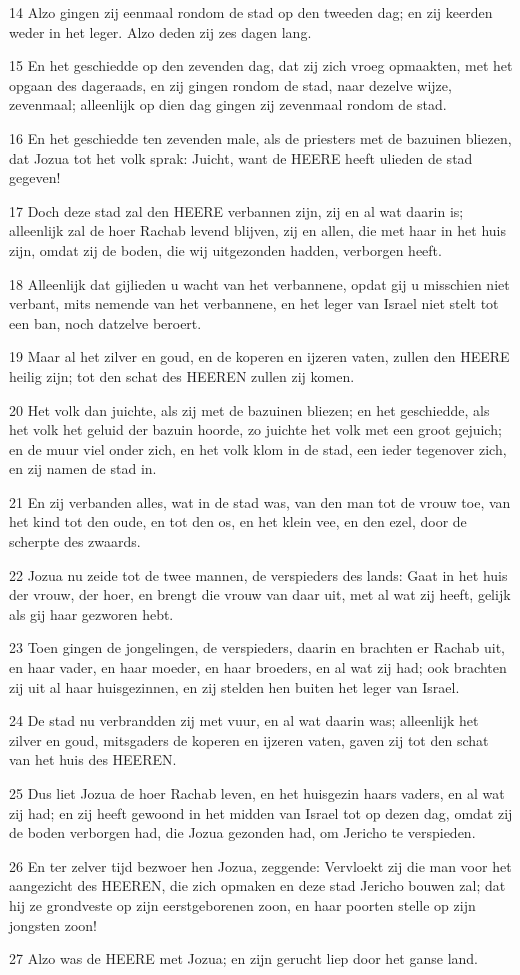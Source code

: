 \par 14 Alzo gingen zij eenmaal rondom de stad op den tweeden dag; en zij keerden weder in het leger. Alzo deden zij zes dagen lang.
\par 15 En het geschiedde op den zevenden dag, dat zij zich vroeg opmaakten, met het opgaan des dageraads, en zij gingen rondom de stad, naar dezelve wijze, zevenmaal; alleenlijk op dien dag gingen zij zevenmaal rondom de stad.
\par 16 En het geschiedde ten zevenden male, als de priesters met de bazuinen bliezen, dat Jozua tot het volk sprak: Juicht, want de HEERE heeft ulieden de stad gegeven!
\par 17 Doch deze stad zal den HEERE verbannen zijn, zij en al wat daarin is; alleenlijk zal de hoer Rachab levend blijven, zij en allen, die met haar in het huis zijn, omdat zij de boden, die wij uitgezonden hadden, verborgen heeft.
\par 18 Alleenlijk dat gijlieden u wacht van het verbannene, opdat gij u misschien niet verbant, mits nemende van het verbannene, en het leger van Israel niet stelt tot een ban, noch datzelve beroert.
\par 19 Maar al het zilver en goud, en de koperen en ijzeren vaten, zullen den HEERE heilig zijn; tot den schat des HEEREN zullen zij komen.
\par 20 Het volk dan juichte, als zij met de bazuinen bliezen; en het geschiedde, als het volk het geluid der bazuin hoorde, zo juichte het volk met een groot gejuich; en de muur viel onder zich, en het volk klom in de stad, een ieder tegenover zich, en zij namen de stad in.
\par 21 En zij verbanden alles, wat in de stad was, van den man tot de vrouw toe, van het kind tot den oude, en tot den os, en het klein vee, en den ezel, door de scherpte des zwaards.
\par 22 Jozua nu zeide tot de twee mannen, de verspieders des lands: Gaat in het huis der vrouw, der hoer, en brengt die vrouw van daar uit, met al wat zij heeft, gelijk als gij haar gezworen hebt.
\par 23 Toen gingen de jongelingen, de verspieders, daarin en brachten er Rachab uit, en haar vader, en haar moeder, en haar broeders, en al wat zij had; ook brachten zij uit al haar huisgezinnen, en zij stelden hen buiten het leger van Israel.
\par 24 De stad nu verbrandden zij met vuur, en al wat daarin was; alleenlijk het zilver en goud, mitsgaders de koperen en ijzeren vaten, gaven zij tot den schat van het huis des HEEREN.
\par 25 Dus liet Jozua de hoer Rachab leven, en het huisgezin haars vaders, en al wat zij had; en zij heeft gewoond in het midden van Israel tot op dezen dag, omdat zij de boden verborgen had, die Jozua gezonden had, om Jericho te verspieden.
\par 26 En ter zelver tijd bezwoer hen Jozua, zeggende: Vervloekt zij die man voor het aangezicht des HEEREN, die zich opmaken en deze stad Jericho bouwen zal; dat hij ze grondveste op zijn eerstgeborenen zoon, en haar poorten stelle op zijn jongsten zoon!
\par 27 Alzo was de HEERE met Jozua; en zijn gerucht liep door het ganse land.

